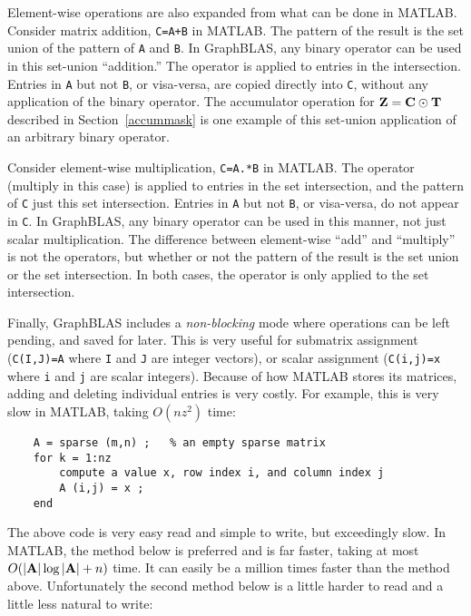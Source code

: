\documentclass[12pt]{article}
\begin{document}
Element-wise operations are also expanded from what can be done in MATLAB.
Consider matrix addition, \verb'C=A+B' in MATLAB.  The pattern of the result is
the set union of the pattern of \verb'A' and \verb'B'.  In GraphBLAS, any
binary operator can be used in this set-union ``addition.''  The operator is
applied to entries in the intersection.  Entries in \verb'A' but not \verb'B',
or visa-versa, are copied directly into \verb'C', without any application of
the binary operator.  The accumulator operation for ${\bf Z = C \odot T}$
described in Section~\ref{accummask} is one example of this set-union
application of an arbitrary binary operator.

Consider element-wise multiplication, \verb'C=A.*B' in MATLAB.  The operator
(multiply in this case) is applied to entries in the set intersection, and the
pattern of \verb'C' just this set intersection.  Entries in \verb'A' but not
\verb'B', or visa-versa, do not appear in \verb'C'.  In GraphBLAS, any binary
operator can be used in this manner, not just scalar multiplication.  The
difference between element-wise ``add'' and ``multiply'' is not the operators,
but whether or not the pattern of the result is the set union or the set
intersection.  In both cases, the operator is only applied to the set
intersection.

Finally, GraphBLAS includes a {\em non-blocking} mode where operations can be
left pending, and saved for later.  This is very useful for submatrix
assignment (\verb'C(I,J)=A' where \verb'I' and \verb'J' are integer vectors),
or scalar assignment (\verb'C(i,j)=x' where \verb'i' and \verb'j' are scalar
integers).  Because of how MATLAB stores its matrices, adding and deleting
individual entries is very costly.  For example, this is very slow in MATLAB,
taking $O(nz^2)$ time:

    \begin{mdframed}
    {\footnotesize
    \begin{verbatim}
    A = sparse (m,n) ;   % an empty sparse matrix
    for k = 1:nz
        compute a value x, row index i, and column index j
        A (i,j) = x ;
    end\end{verbatim}}\end{mdframed}

The above code is very easy read and simple to write, but exceedingly slow.  In
MATLAB, the method below is preferred and is far faster, taking at most
$O(|{\bf A}| \log |{\bf A}| +n)$ time.  It can easily be a million times faster
than the method above.  Unfortunately the second method below is a little
harder to read and a little less natural to write:
\end{document}
